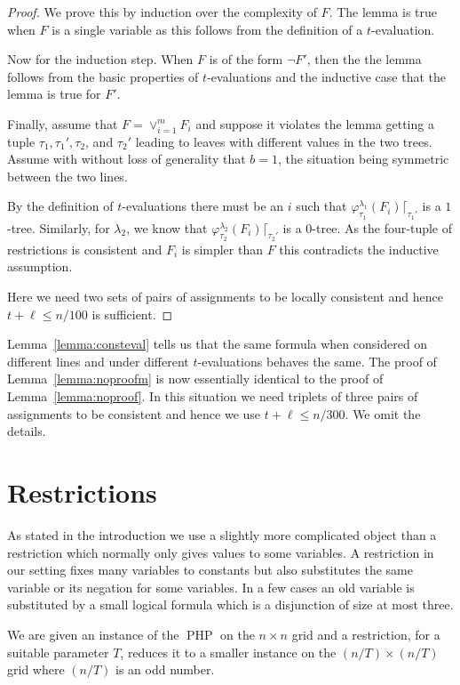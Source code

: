 \documentclass{theoretics}
\DeclareMathOperator{\PHP}{PHP}
\begin{document}
\begin{proof}
We prove this by induction over the complexity of $F$.
The lemma is true when $F$ is a single variable
as this follows from the definition of a $t$-evaluation.

Now for the induction step.  When $F$ is of
the form $\neg F'$, then the the
lemma follows from the basic properties of
$t$-evaluations and the inductive case that
the lemma is true for $F'$.

Finally, assume that $F=\lor_{i=1}^m F_i$ and suppose
it violates the lemma getting a tuple $\tau_1, \tau_1',
\tau_2$, and $\tau_2'$ leading to leaves with
different values in the two trees.  Assume with
without loss of generality that $b=1$, the situation
being symmetric between the two lines.

By the definition of $t$-evaluations there
must be an $i$ such that 
$\varphi_{\tau_1}^{\lambda_1} (F_i) \lceil_{\tau_1'}$
is a $1$-tree.  Similarly, for
$\lambda_2$, we know that
$\varphi_{\tau_2}^{\lambda_2} (F_i) \lceil_{\tau_2'}$
is a $0$-tree.  As the four-tuple of restrictions is
consistent and $F_i$ is simpler than $F$ this
contradicts the inductive assumption.

Here we need two sets of pairs of assignments to be
locally consistent and hence $t+ \ell \leq n/100$
is sufficient.
\end{proof}

Lemma~\ref{lemma:consteval} tells us that
the same formula when considered on different
lines and under different $t$-evaluations
behaves the same.  The proof of Lemma~\ref{lemma:noproofm}
is now essentially identical to the
proof of Lemma~\ref{lemma:noproof}.  In this situation
we need triplets of three pairs of assignments to be
consistent and hence we use $t + \ell \leq n/300$.
We omit the details.

\section{Restrictions}\label{sec:restrictions}

As stated in the introduction we use a slightly more complicated object than a restriction
which normally only gives values to some variables.
A restriction in our setting fixes many variables to constants but
also substitutes the same variable or its negation for
some variables.  In a few cases an old variable is substituted
by a small logical formula which is a disjunction of
size at most three.

We are given an instance of the $\PHP$ on the $n\times n$ grid
and a restriction, for a suitable parameter $T$, reduces it to a smaller
instance on the $(n/T) \times (n/T)$ grid where $(n/T)$ is an odd number.
\end{document}
